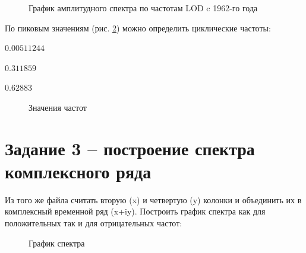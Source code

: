 \documentclass[a4paper,oneside,14pt]{extreport}
\begin{document}
\begin{figure}[h]
	\caption{График амплитудного спектра по частотам LOD c 1962-го года}
	\label{task2_g3}
\end{figure}

\newpage
По пиковым значениям (рис. \ref{task2_freq_vals}) можно определить циклические частоты: 

$0.00511244$

$0.311859$

$0.62883$

%
%
%

\begin{figure}[h]
	\caption{Значения частот}
	\label{task2_freq_vals}
\end{figure}

\section*{Задание 3 – построение спектра комплексного ряда}

Из того же файла считать вторую (x) и четвертую (y) колонки и объединить их в  комплексный временной ряд (x+iy). Построить график спектра как для положительных так и для отрицательных частот:

\begin{figure}[h]
	\caption{График спектра}
	\label{task3_g1}
\end{figure}
\end{document}
